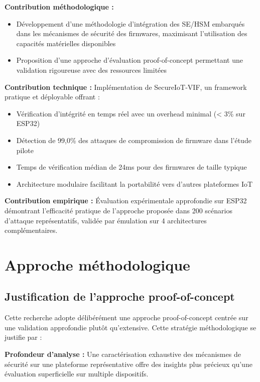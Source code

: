\textbf{Contribution méthodologique :} 
\begin{itemize}
    \item Développement d'une méthodologie d'intégration des \ac{SE}/\ac{HSM} embarqués dans les mécanismes de sécurité des firmwares, maximisant l'utilisation des capacités matérielles disponibles
    \item Proposition d'une approche d'évaluation proof-of-concept permettant une validation rigoureuse avec des ressources limitées
\end{itemize}

\textbf{Contribution technique :} Implémentation de SecureIoT-VIF, un framework pratique et déployable offrant :
\begin{itemize}
    \item Vérification d'intégrité en temps réel avec un overhead minimal (< 3\% sur ESP32)
    \item Détection de 99,0\% des attaques de compromission de firmware dans l'étude pilote
    \item Temps de vérification médian de 24ms pour des firmwares de taille typique
    \item Architecture modulaire facilitant la portabilité vers d'autres plateformes IoT
\end{itemize}

\textbf{Contribution empirique :} Évaluation expérimentale approfondie sur ESP32 démontrant l'efficacité pratique de l'approche proposée dans 200 scénarios d'attaque représentatifs, validée par émulation sur 4 architectures complémentaires.

\section{Approche méthodologique}

\subsection{Justification de l'approche proof-of-concept}

Cette recherche adopte délibérément une approche proof-of-concept centrée sur une validation approfondie plutôt qu'extensive. Cette stratégie méthodologique se justifie par :

\textbf{Profondeur d'analyse :} Une caractérisation exhaustive des mécanismes de sécurité sur une plateforme représentative offre des insights plus précieux qu'une évaluation superficielle sur multiple dispositifs.

